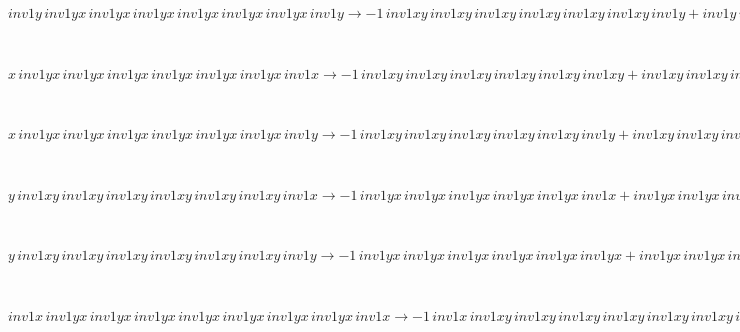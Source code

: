 \documentclass[rep10,leqno]{report}
\begin{document}
\begin{minipage}{6in}
$
inv1y\,
 inv1yx\,
 inv1yx\,
 inv1yx\,
 inv1yx\,
 inv1yx\,
 inv1yx\,
 inv1y\rightarrow -1\,
 inv1xy\,
 inv1xy\,
 inv1xy\,
 inv1xy\,
 inv1xy\,
 inv1xy\,
 inv1y + inv1y\,
 inv1yx\,
 inv1yx\,
 inv1yx\,
 inv1yx\,
 inv1yx\,
 inv1yx + inv1y\,
 inv1xy\,
 inv1xy\,
 inv1xy\,
 inv1xy\,
 inv1xy\,
 inv1xy\,
 inv1y
$
\end{minipage}\medskip \\
\begin{minipage}{6in}
$
x\,
 inv1yx\,
 inv1yx\,
 inv1yx\,
 inv1yx\,
 inv1yx\,
 inv1yx\,
 inv1x\rightarrow -1\,
 inv1xy\,
 inv1xy\,
 inv1xy\,
 inv1xy\,
 inv1xy\,
 inv1xy + inv1xy\,
 inv1xy\,
 inv1xy\,
 inv1xy\,
 inv1xy\,
 inv1xy\,
 inv1x
$
\end{minipage}\medskip \\
\begin{minipage}{6in}
$
x\,
 inv1yx\,
 inv1yx\,
 inv1yx\,
 inv1yx\,
 inv1yx\,
 inv1yx\,
 inv1y\rightarrow -1\,
 inv1xy\,
 inv1xy\,
 inv1xy\,
 inv1xy\,
 inv1xy\,
 inv1y + inv1xy\,
 inv1xy\,
 inv1xy\,
 inv1xy\,
 inv1xy\,
 inv1xy\,
 inv1y + x\,
 inv1yx\,
 inv1yx\,
 inv1yx\,
 inv1yx\,
 inv1yx\,
 inv1yx
$
\end{minipage}\medskip \\
\begin{minipage}{6in}
$
y\,
 inv1xy\,
 inv1xy\,
 inv1xy\,
 inv1xy\,
 inv1xy\,
 inv1xy\,
 inv1x\rightarrow -1\,
 inv1yx\,
 inv1yx\,
 inv1yx\,
 inv1yx\,
 inv1yx\,
 inv1x + inv1yx\,
 inv1yx\,
 inv1yx\,
 inv1yx\,
 inv1yx\,
 inv1yx\,
 inv1x + y\,
 inv1xy\,
 inv1xy\,
 inv1xy\,
 inv1xy\,
 inv1xy\,
 inv1xy
$
\end{minipage}\medskip \\
\begin{minipage}{6in}
$
y\,
 inv1xy\,
 inv1xy\,
 inv1xy\,
 inv1xy\,
 inv1xy\,
 inv1xy\,
 inv1y\rightarrow -1\,
 inv1yx\,
 inv1yx\,
 inv1yx\,
 inv1yx\,
 inv1yx\,
 inv1yx + inv1yx\,
 inv1yx\,
 inv1yx\,
 inv1yx\,
 inv1yx\,
 inv1yx\,
 inv1y
$
\end{minipage}\medskip \\
\begin{minipage}{6in}
$
inv1x\,
 inv1yx\,
 inv1yx\,
 inv1yx\,
 inv1yx\,
 inv1yx\,
 inv1yx\,
 inv1yx\,
 inv1x\rightarrow -1\,
 inv1x\,
 inv1xy\,
 inv1xy\,
 inv1xy\,
 inv1xy\,
 inv1xy\,
 inv1xy\,
 inv1xy + inv1yx\,
 inv1yx\,
 inv1yx\,
 inv1yx\,
 inv1yx\,
 inv1yx\,
 inv1yx\,
 inv1x + inv1x\,
 inv1xy\,
 inv1xy\,
 inv1xy\,
 inv1xy\,
 inv1xy\,
 inv1xy\,
 inv1xy\,
 inv1x
$
\end{minipage}\medskip \\
\end{document}
